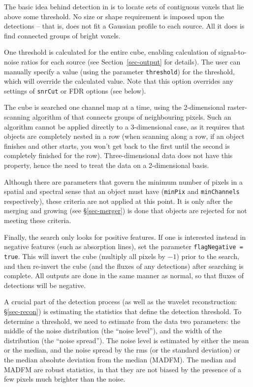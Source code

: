 \label{sec-detection}


The basic idea behind detection in \duchamp is to locate sets of
contiguous voxels that lie above some threshold. No size or shape
requirement is imposed upon the detections -- that is, \duchamp does
not fit \eg a Gaussian profile to each source. All it does is find
connected groups of bright voxels.

One threshold is calculated for the entire cube, enabling calculation
of signal-to-noise ratios for each source (see
Section~\ref{sec-output} for details). The user can manually specify a
value (using the parameter \texttt{threshold}) for the threshold,
which will override the calculated value. Note that this option
overrides any settings of \texttt{snrCut} or FDR options (see below). 

The cube is searched one channel map at a time, using the
2-dimensional raster-scanning algorithm of \citet{lutz80} that
connects groups of neighbouring pixels. Such an algorithm cannot be
applied directly to a 3-dimensional case, as it requires that objects
are completely nested in a row (when scanning along a row, if an
object finishes and other starts, you won't get back to the first
until the second is completely finished for the
row). Three-dimensional data does not have this property, hence the
need to treat the data on a 2-dimensional basis.

Although there are parameters that govern the minimum number of pixels
in a spatial and spectral sense that an object must have
(\texttt{minPix} and \texttt{minChannels} respectively), these
criteria are not applied at this point. It is only after the merging
and growing (see \S\ref{sec-merger}) is done that objects are rejected
for not meeting these criteria.

Finally, the search only looks for positive features. If one is
interested instead in negative features (such as absorption lines),
set the parameter \texttt{flagNegative = true}. This will invert the
cube (\ie multiply all pixels by $-1$) prior to the search, and then
re-invert the cube (and the fluxes of any detections) after searching
is complete. All outputs are done in the same manner as normal, so
that fluxes of detections will be negative.

\label{sec-stats}

A crucial part of the detection process (as well as the wavelet
reconstruction: \S\ref{sec-recon}) is estimating the statistics that
define the detection threshold. To determine a threshold, we need to
estimate from the data two parameters: the middle of the noise
distribution (the ``noise level''), and the width of the distribution
(the ``noise spread''). The noise level is estimated by either the
mean or the median, and the noise spread by the rms (or the standard
deviation) or the median absolute deviation from the median
(MADFM). The median and MADFM are robust statistics, in that they are
not biased by the presence of a few pixels much brighter than the
noise.

